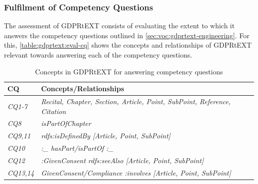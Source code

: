 \subsubsection{Fulfilment of Competency Questions}
The assessment of GDPRtEXT consists of evaluating the extent to which it answers the competency questions outlined in \autoref{sec:voc:gdprtext-engineering}.
For this, \autoref{table:gdprtext:eval-cq} shows the concepts and relationships of GDPRtEXT relevant towards answering each of the competency questions.
\begin{table}[htbp]
\footnotesize
\centering
{}
\begin{tabularx}{\textwidth}{|l|X|}
\caption{Concepts in GDPRtEXT for answering competency questions} \\ \hline
\label{table:gdprtext:eval-cq}
\textbf{CQ} & \textbf{Concepts/Relationships} \\ \hline
\textit{CQ1-7} & \textit{Recital, Chapter, Section, Article, Point, SubPoint, Reference, Citation} \\ \hline
\textit{CQ8} & \textit{isPartOfChapter} \\ \hline
\textit{CQ9,11} & \textit{rdfs:isDefinedBy [Article, Point, SubPoint]} \\ \hline
\textit{CQ10} & \textit{:\_ hasPart/isPartOf :\_} \\ \hline
\textit{CQ12} & \textit{:GivenConsent rdfs:seeAlso [Article, Point, SubPoint]} \\ \hline
\textit{CQ13,14} & \textit{GivenConsent/Compliance :involves [Article, Point, SubPoint]} \\ \hline


\end{tabularx}
\end{table}
